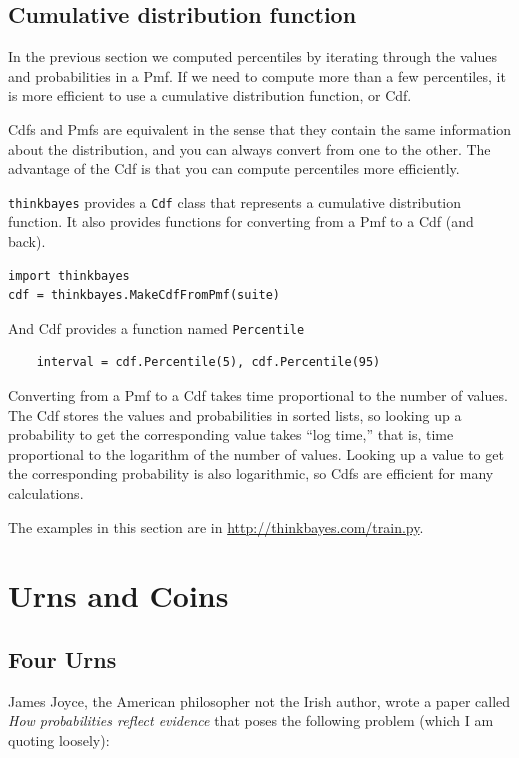\documentclass[12pt]{book}
\begin{document}
\section{Cumulative distribution function}

In the previous section we computed percentiles by iterating through
the values and probabilities in a Pmf.  If we need to compute more
than a few percentiles, it is more efficient to use a cumulative
distribution function, or Cdf.

Cdfs and Pmfs are equivalent in the sense that they contain the
same information about the distribution, and you can always convert
from one to the other.  The advantage of the Cdf is that you can
compute percentiles more efficiently.

{\tt thinkbayes} provides a {\tt Cdf} class that represents a
cumulative distribution function.  It also provides functions for
converting from a Pmf to a Cdf (and back). 

\begin{verbatim}
import thinkbayes
cdf = thinkbayes.MakeCdfFromPmf(suite)
\end{verbatim}

And Cdf provides a function named \verb"Percentile"

\begin{verbatim}
    interval = cdf.Percentile(5), cdf.Percentile(95)
\end{verbatim}

Converting from a Pmf to a Cdf takes time proportional to the number
of values.  The Cdf stores the values and probabilities in sorted
lists, so looking up a probability to get the corresponding value
takes ``log time,'' that is, time proportional to the logarithm of the
number of values.  Looking up a value to get the corresponding
probability is also logarithmic, so Cdfs are efficient for many
calculations.

The examples in this section are in \url{http://thinkbayes.com/train.py}.


\chapter{Urns and Coins}

\section{Four Urns}

James Joyce, the American philosopher not the Irish author, wrote
a paper called {\it How probabilities reflect evidence} that poses
the following problem (which I am quoting loosely):
\end{document}
